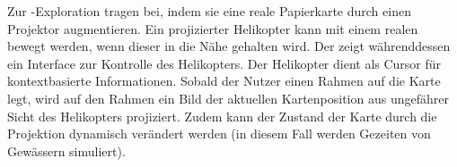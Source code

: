 Zur -Exploration tragen \textcite{Reitmayr2005} bei, indem sie eine reale Papierkarte durch einen Projektor augmentieren.
Ein projizierter Helikopter kann mit einem realen  bewegt werden, wenn dieser in die Nähe gehalten wird.
Der  zeigt währenddessen ein Interface zur Kontrolle des Helikopters.
Der Helikopter dient als Cursor für kontextbasierte Informationen.
Sobald der Nutzer einen Rahmen auf die Karte legt, wird auf den Rahmen ein Bild der aktuellen Kartenposition aus ungefährer Sicht des Helikopters projiziert.
Zudem kann der Zustand der Karte durch die Projektion dynamisch verändert werden (in diesem Fall werden Gezeiten von Gewässern simuliert).

%
\cleardoublepage